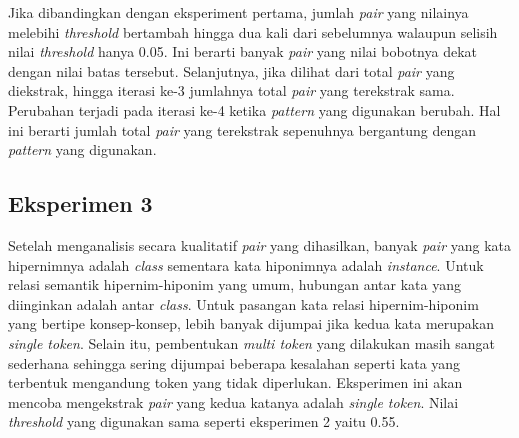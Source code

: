Jika dibandingkan dengan eksperiment pertama, jumlah \textit{pair} yang nilainya melebihi \textit{threshold} bertambah hingga dua kali dari sebelumnya walaupun selisih nilai \textit{threshold} hanya 0.05. Ini berarti banyak \textit{pair} yang nilai bobotnya dekat dengan nilai batas tersebut. Selanjutnya, jika dilihat dari total \textit{pair} yang diekstrak, hingga iterasi ke-3 jumlahnya total \textit{pair} yang terekstrak sama. Perubahan terjadi pada iterasi ke-4 ketika \textit{pattern} yang digunakan berubah. Hal ini berarti jumlah total \textit{pair} yang terekstrak sepenuhnya bergantung dengan \textit{pattern} yang digunakan.
%

\subsection{Eksperimen 3}
Setelah menganalisis secara kualitatif \textit{pair} yang dihasilkan, banyak \textit{pair} yang kata hipernimnya adalah \textit{class} sementara kata hiponimnya adalah \textit{instance}. Untuk relasi semantik hipernim-hiponim yang umum, hubungan antar kata yang diinginkan adalah antar \textit{class}. Untuk pasangan kata relasi hipernim-hiponim yang bertipe konsep-konsep, lebih banyak dijumpai jika kedua kata merupakan \textit{single token}. Selain itu, pembentukan \textit{multi token} yang dilakukan masih sangat sederhana sehingga sering dijumpai beberapa kesalahan seperti kata yang terbentuk mengandung token yang tidak diperlukan. Eksperimen ini akan mencoba mengekstrak \textit{pair} yang kedua katanya adalah \textit{single token}. Nilai \textit{threshold} yang digunakan sama seperti eksperimen 2 yaitu 0.55.

